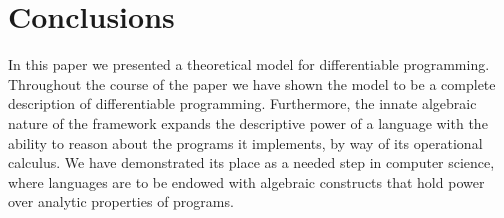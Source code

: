 \section{Conclusions}

In this paper we presented a theoretical model for differentiable programming. Throughout the course of the paper we have shown the model to be a complete description of differentiable programming.
Furthermore, the innate algebraic nature of the framework expands the descriptive power of a language with the ability to reason about the programs it implements, by way of its operational calculus. We have demonstrated its place as a needed step in computer science, where languages are to be endowed with algebraic constructs that hold power over analytic properties of programs. 
